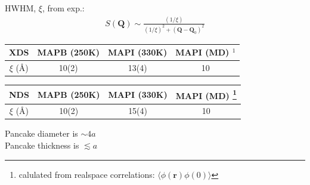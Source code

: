 \documentclass[12pt]{beamer}
\begin{document}

%
%
%


\begin{frame} %

HWHM, $\xi$, from exp.: 
\begin{equation*}
\begin{gathered}
    S(\bm{Q}) \sim \frac{(1/\xi)}{(1/\xi)^2 +(\bm{Q}-\bm{Q}_0)^2} 
\end{gathered}
\end{equation*}

\begin{center}
\begin{tabular}{||c | c c c||}
\hline
    XDS & MAPB (250K) & MAPI (330K) & MAPI (MD) $^1$\\ [0.5ex]
    \hline\hline 
    $\xi$ (\AA) & 10(2) & 13(4) & 10 \\ [1ex]
    \hline\hline
\end{tabular}
\end{center}
\begin{center}
\begin{tabular}{||c | c c c||}
\hline
    NDS & MAPB (250K) & MAPI (330K) & MAPI (MD) \footnote{calulated from realspace correlations: $\langle \phi(\bm{r}) \phi(0) \rangle$}  \\ [0.5ex]
    \hline\hline
    $\xi$ (\AA) & 10(2) & 15(4) & 10 \\ [1ex]
    \hline\hline
\end{tabular}
\end{center}

\vspace{0.5cm}
Pancake diameter is $ \sim 4a$  \\
Pancake thickness is $ \lesssim a$

\end{frame}

\end{document}
